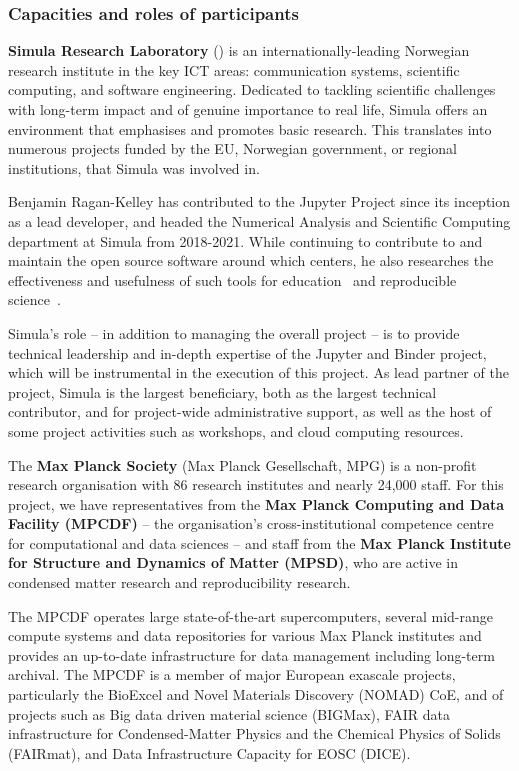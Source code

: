 \subsubsection{Capacities and roles of participants}

\noindent \textbf{Simula Research Laboratory}
() is an internationally-leading Norwegian research institute in the key
ICT areas: communication systems, scientific computing, and software
engineering. Dedicated to tackling scientific challenges with long-term impact and of
genuine importance to real life, Simula offers an environment that emphasises
and promotes basic research. This translates into numerous projects funded by
the EU, Norwegian government, or regional institutions, that Simula was
involved in.

Benjamin Ragan-Kelley has contributed to the Jupyter Project since its
inception as a lead developer, and headed the Numerical Analysis and
Scientific Computing department at Simula from 2018-2021.
While continuing to contribute to and maintain the
open source software around which \TheProject centers,
he also researches the effectiveness and usefulness of such tools for education~\cite{JupyterHub-for-education-2016}
and reproducible science~\cite{binder,Forde2018ReproducibleRE,nbval-arxiv,repo2docker-checker2020,Beg2021}.

Simula's role -- in addition to managing the overall project -- is to provide
technical leadership and in-depth expertise of the Jupyter and Binder project, which will be
instrumental in the execution of this project.
As lead partner of the project,
Simula is the largest beneficiary, both as the largest technical contributor,
and for project-wide administrative support,
as well as the host of some project activities such as workshops,
and cloud computing resources.

\medskip \noindent The \textbf{Max Planck Society}
(Max Planck Gesellschaft, MPG) is a non-profit research
organisation with 86 research institutes and nearly 24,000 staff. For this
project, we have representatives from the \textbf{Max Planck Computing and Data
Facility (MPCDF)} -- the organisation's cross-institutional competence centre
for computational and data sciences -- and staff from the \textbf{Max Planck Institute
for Structure and Dynamics of Matter (MPSD)}, who are active in condensed matter research and
reproducibility research.

The MPCDF operates large state-of-the-art supercomputers, several mid-range
compute systems and data repositories for various Max Planck institutes and
provides an up-to-date infrastructure for data management including long-term
archival.
The MPCDF is a member of major European exascale projects, particularly the
BioExcel and Novel Materials Discovery (NOMAD) CoE, and of projects
such as Big data driven material science (BIGMax), FAIR data infrastructure for
Condensed-Matter Physics and the Chemical Physics of Solids (FAIRmat), and Data
Infrastructure Capacity for EOSC (DICE).

